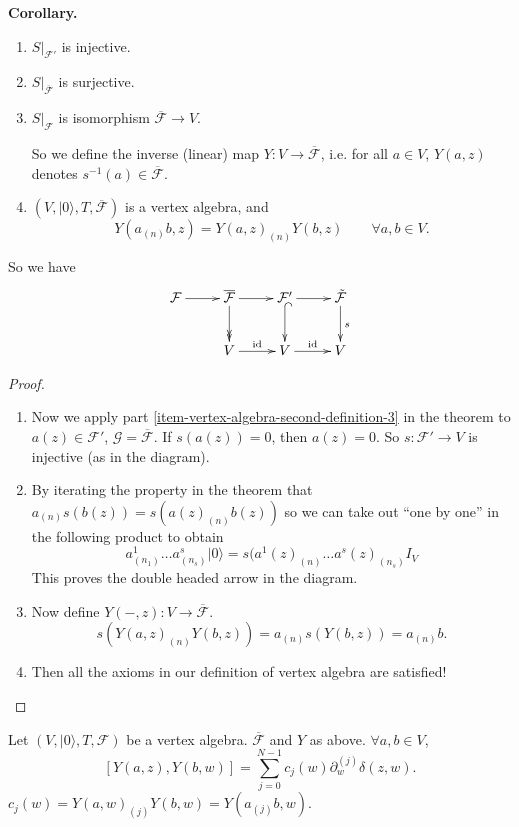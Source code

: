 \medskip\noindent
{\bf Corollary.}
\begin{enumerate}
\item $S|_{\mathcal{F}'}$ is injective.
\item $S|_{\overline{\mathcal{F}}}$ is surjective.
\item $S|_{\mathcal{F}}$ is isomorphism $\overline{\mathcal{F}}\to V$.

So we define the inverse (linear) map $Y:V \to \overline{\mathcal{F}}$,
i.e. for all $a \in V$, $Y(a,z)$ denotes $s^{-1}(a) \in \overline{\mathcal{F}}$.

\item $(V,|0\rangle,T,\overline{\mathcal{F}})$ is a vertex algebra,
and
$$
Y(a_{(n)}b,z)=Y(a,z)_{(n)}Y(b,z)\qquad \forall a,b \in V.
$$
\end{enumerate}

So we have
$$
\xymatrix{
\mathcal{F}\ar[r]&\overline{\mathcal{F}}\ar@{->>}[d]\ar[r]&
\mathcal{F}'\ar@{^{(}->}[d]\ar[r]&\tilde{\mathcal{F}}\ar[d]^s\\
&  V\ar[r]^{\text{id}}& V\ar[r]^{\text{id}} &V
}
$$
\begin{proof}
\begin{enumerate}
\item Now we apply part \ref{item-vertex-algebra-second-definition-3}
 in the theorem to $a(z) \in \mathcal{F}'$,
$\mathcal{G}=\overline{\mathcal{F}}$.
If $s(a(z))=0$, then  $a(z)=0$. So  $s:\mathcal{F}' \to V$ is injective
(as in the diagram).

\item By iterating the property in the theorem that
$a_{(n)}s(b(z))=s(a(z)_{(n)}b(z))$ so we can take out ``one by one''
in the following product to obtain
$$
a^1_{(n_1)}\ldots a_{(n_s)}^s |0\rangle
=s(a^1(z)_{(n)}\ldots a^s(z)_{(n_s)}I_V
$$
This proves the double headed arrow in the diagram.

\item Now define $Y(-,z):V \to \overline{\mathcal{F}}$.
$$
s(Y(a,z)_{(n)}Y(b,z))=a_{(n)}s(Y(b,z))=a_{(n)}b.
$$
\item Then all the axioms in our definition of vertex algebra are
satisfied!
\end{enumerate}
\end{proof}

\begin{remark}
\label{remark-a-relation}
Let $(V,|0\rangle,T,\mathcal{F})$ be a vertex algebra.
$\overline{\mathcal{F}}$ and $Y$ as above.
$\forall a,b \in V$,
\begin{equation}
\label{equation-star2}
[Y(a,z),Y(b,w)]=\sum_{j=0}^{N-1}c_j(w)\partial_w^{(j)}\delta(z,w).
\end{equation}
$c_j(w)=Y(a,w)_{(j)}Y(b,w)=Y(a_{(j)}b,w)$.
\end{remark}


